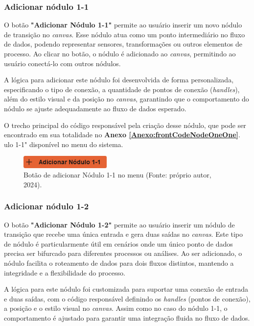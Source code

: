 \subsubsection{Adicionar nódulo 1-1}

O botão \textbf{"Adicionar Nódulo 1-1"} permite ao usuário inserir um novo nódulo de transição no \textit{canvas}. Esse nódulo atua como um ponto intermediário no fluxo de dados, podendo representar sensores, transformações ou outros elementos de processo. Ao clicar no botão, o nódulo é adicionado ao \textit{canvas}, permitindo ao usuário conectá-lo com outros nódulos.

A lógica para adicionar este nódulo foi desenvolvida de forma personalizada, especificando o tipo de conexão, a quantidade de pontos de conexão (\textit{handles}), além do estilo visual e da posição no \textit{canvas}, garantindo que o comportamento do nódulo se ajuste adequadamente ao fluxo de dados esperado.

O trecho principal do código responsável pela criação desse nódulo, que pode ser encontrado em sua totalidade no \textbf{Anexo \ref{Anexo:frontCodeNodeOneOne}}.
ulo 1-1" disponível no menu do sistema.

\begin{figure}[htbp]
    \centering
    \includegraphics[width=0.4\textwidth]{figuras/add-node11-button.png}
    \caption{Botão de adicionar Nódulo 1-1 no menu (Fonte: próprio autor, 2024).}
    \label{Fig:AddNodeOneOneButton}
\end{figure}

\subsubsection{Adicionar nódulo 1-2}

O botão \textbf{"Adicionar Nódulo 1-2"} permite ao usuário inserir um nódulo de transição que recebe uma única entrada e gera duas saídas no \textit{canvas}. Este tipo de nódulo é particularmente útil em cenários onde um único ponto de dados precisa ser bifurcado para diferentes processos ou análises. Ao ser adicionado, o nódulo facilita o roteamento de dados para dois fluxos distintos, mantendo a integridade e a flexibilidade do processo.

A lógica para este nódulo foi customizada para suportar uma conexão de entrada e duas saídas, com o código responsável definindo os \textit{handles} (pontos de conexão), a posição e o estilo visual no \textit{canvas}. Assim como no caso do nódulo 1-1, o comportamento é ajustado para garantir uma integração fluida no fluxo de dados.


